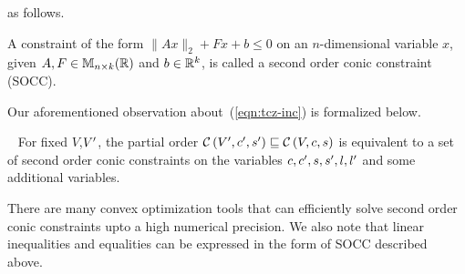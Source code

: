 as follows.
%
\begin{definition}[SOCC]
A constraint of the form $\|Ax\|_{2}+Fx+b\leq 0$ on an $n$-dimensional
variable $x$, given $A,F\in\mathbb{M}_{n\times k}(\mathbb{\mathbb{R}})$ and $b\in\mathbb{R}^k$, is
called a second order conic constraint (SOCC).
\end{definition}
%
   Our aforementioned observation about~(\ref{eqn:tcz-inc}) is
 formalized below.
%
\begin{lemma}~\label{lem:zon-socc}
For fixed $V$,$V^\prime$, the partial order
$\mathcal{C}\left(V^\prime,c^\prime,s^\prime\right)\sqsubseteq \mathcal{C}\left(V,c,s\right)$ is equivalent to a set
of second order conic constraints on the variables
$c,c^\prime,s,s^\prime,l,l^\prime$ and some additional variables.
\end{lemma}
%
There are many convex optimization tools that can efficiently solve
second order conic constraints upto a high numerical precision.  We
also note that linear inequalities and equalities can be expressed in
the form of SOCC described above.
